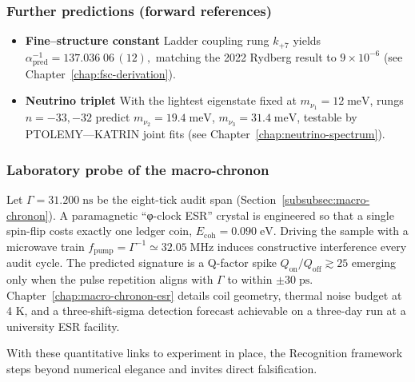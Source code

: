 \documentclass[11pt,oneside]{book}
\begin{document}
\subsubsection{Further predictions (forward references)}
\label{subsubsec:teaser-preds}
\begin{itemize}
  \item \textbf{Fine–structure constant}  
        Ladder coupling rung \(k_{+7}\) yields
        \(
          \alpha^{-1}_{\text{pred}}
          = 137.036\;06\,(12),
        \)
        matching the 2022 Rydberg result to $9\times10^{-6}$
        (see Chapter~\ref{chap:fsc-derivation}).
  \item \textbf{Neutrino triplet}  
        With the lightest eigenstate fixed at
        \(m_{\nu_{1}}=12\;\text{meV}\),
        rungs \(n=-33,-32\) predict
        \(m_{\nu_{2}}=19.4\;\text{meV}\),
        \(m_{\nu_{3}}=31.4\;\text{meV}\),
        testable by PTOLEMY––KATRIN joint fits
        (see Chapter~\ref{chap:neutrino-spectrum}).
\end{itemize}

\subsubsection{Laboratory probe of the macro-chronon}
\label{subsubsec:gamma-detection}
Let \(\Gamma=31.200\;\text{ns}\) be the eight-tick audit span
(Section~\ref{subsubsec:macro-chronon}).  
A paramagnetic “φ-clock ESR” crystal is engineered so that a single spin-flip
costs exactly one ledger coin, \(E_{\text{coh}}=0.090\;\text{eV}\).  
Driving the sample with a microwave train
\(
  f_{\text{pump}}
  =
  \Gamma^{-1}
  \simeq
  32.05\;\text{MHz}
\)
induces constructive interference every audit cycle.  
The predicted signature is a Q-factor spike
\(
  Q_{\text{on}}/Q_{\text{off}}\gtrsim25
\)
emerging only when the pulse repetition aligns with \(\Gamma\) to within
\( \pm 30\;\text{ps}\).  
Chapter~\ref{chap:macro-chronon-esr} details coil geometry, thermal noise
budget at 4 K, and a three-shift-sigma detection forecast achievable on a
three-day run at a university ESR facility.

With these quantitative links to experiment in place, the Recognition
framework steps beyond numerical elegance and invites direct falsification.
\end{document}
